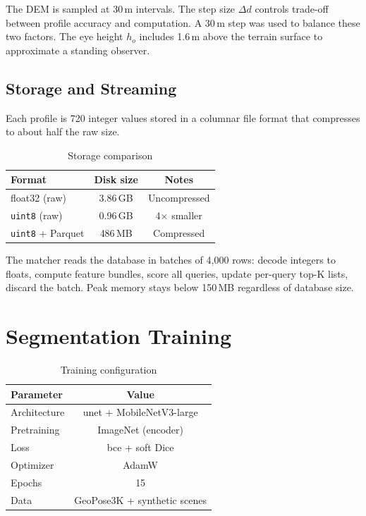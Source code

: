 \noindent The DEM is sampled at 30\,m intervals. The step size $\Delta d$ controls trade-off between profile accuracy and computation. A 30\,m step was used to balance these two factors. The eye height $h_o$ includes 1.6\,m above the terrain surface to approximate a standing observer.

\subsection{Storage and Streaming}

Each profile is 720 integer values stored in a columnar file format that compresses to about half the raw size.

\begin{table}[H]
\centering
\caption{Storage comparison}
\label{tab:storage_comparison}
\begin{tabular}{lcc}
\toprule
\textbf{Format} & \textbf{Disk size} & \textbf{Notes} \\
\midrule
float32 (raw) & 3.86\,GB & Uncompressed \\
\texttt{uint8} (raw) & 0.96\,GB & 4$\times$ smaller \\
\texttt{uint8} + Parquet & 486\,MB & Compressed \\
\bottomrule
\end{tabular}
\end{table}

The matcher reads the database in batches of 4{,}000 rows: decode integers to floats, compute feature bundles, score all queries, update per-query top-K lists, discard the batch. Peak memory stays below 150\,MB regardless of database size.

\section{Segmentation Training}

\begin{table}[H]
\centering
\caption{Training configuration}
\label{tab:training_config}
\begin{tabular}{lc}
\toprule
\textbf{Parameter} & \textbf{Value} \\
\midrule
Architecture & \Gls{unet} + MobileNetV3-large \\
Pretraining & ImageNet (encoder) \\
Loss & \Gls{bce} + soft Dice \\
Optimizer & AdamW \\
Epochs & 15 \\
Data & GeoPose3K + synthetic scenes \\
\bottomrule
\end{tabular}
\end{table}

